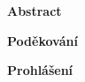 \documentclass[
a4paper, %
11pt, %
onecolumn, %
openany, %
oldfontcommands,
]{memoir}
\begin{document}
\vspace{3cm}
\vfill


\noindent\Large\textbf{Abstract}\\ \normalsize



%
\newpage

\noindent\Large\textbf{Poděkování}\\ \normalsize


\vfill
\noindent\Large\textbf{Prohlášení}\\ \normalsize
\end{document}
